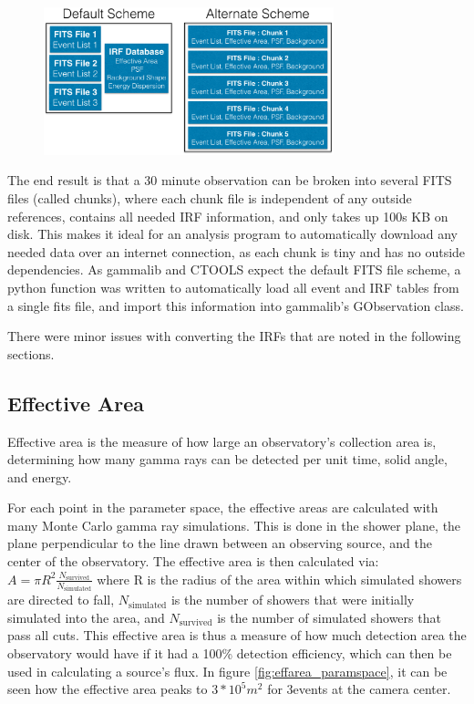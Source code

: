\begin{figure}[ht]
  \begin{center}
    \includegraphics[width=0.75\textwidth]{images/FITS_diagrams_alternate_scheme.eps}
    \caption[FITS File Event Storage Schemes]{}\label{fig:fits_scheme}
  \end{center}
\end{figure}

The end result is that a 30 minute observation can be broken into several FITS files (called chunks), where each chunk file is independent of any outside references, contains all needed IRF information, and only takes up \nicetilde100s KB on disk.
This makes it ideal for an analysis program to automatically download any needed data over an internet connection, as each chunk is tiny and has no outside dependencies.
As gammalib and CTOOLS expect the default FITS file scheme, a python function was written to automatically load all event and IRF tables from a single fits file, and import this information into gammalib's GObservation class.

There were minor issues with converting the IRFs that are noted in the following sections.


\subsection{Effective Area}\label{subsec:effarea}
Effective area is the measure of how large an observatory's collection area is, determining how many gamma rays can be detected per unit time, solid angle, and energy.

For each point in the parameter space, the effective areas are calculated with many Monte Carlo gamma ray simulations.
This is done in the shower plane, the plane perpendicular to the line drawn between an observing source, and the center of the observatory.
The effective area is then calculated via:
$A=\pi R^2 \frac{N_{\text{survived}}}{N_{\text{simulated}}}$
where R is the radius of the area within which simulated showers are directed to fall, $N_{\text{simulated}}$ is the number of showers that were initially simulated into the area, and $N_{\text{survived}}$ is the number of simulated showers that pass all cuts.
This effective area is thus a measure of how much detection area the observatory would have if it had a 100\% detection efficiency, which can then be used in calculating a source's flux.
In figure \ref{fig:effarea_paramspace}, it can be seen how the effective area peaks to \nicetilde$3*10^5 m^2$ for 3\TeV events at the camera center.

